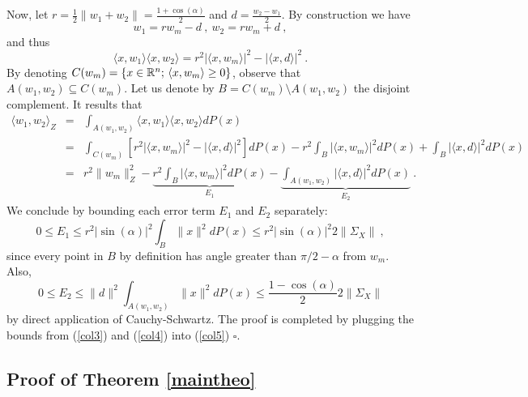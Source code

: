 Now, let $r = \frac{1}{2}\| w_1 + w_2 \| = \frac{1 + \cos(\alpha)}{2}$ and $d = \frac{w_2 - w_1}{2}$.
By construction we have 
$$w_1 = r w_m - d~,~ w_2 = r w_m + d~,$$
and thus 
\begin{equation}
\label{col2}
\langle x, w_1 \rangle  \langle x, w_2 \rangle = r^2 | \langle x, w_m \rangle |^2 - | \langle x, d \rangle |^2~.
\end{equation}
By denoting $C(w_m) = \{ x \in {\mathbb{R}}^n;\, \langle x, w_m \rangle \geq 0 \}$, 
observe that $A(w_1, w_2 ) \subseteq C(w_m)$. Let us denote by $B = C(w_m) \setminus A(w_1, w_2) $ the disjoint complement. It results that 
\begin{eqnarray}
\label{col5}
\langle w_1, w_2 \rangle_Z &=& \int_{A(w_1, w_2)} \langle x, w_1 \rangle  \langle x, w_2 \rangle dP(x) \nonumber \\
&=& \int_{C(w_m)} [r^2 | \langle x, w_m \rangle |^2 - | \langle x, d \rangle |^2 ] dP(x) - r^2 \int_B  | \langle x, w_m \rangle |^2 dP(x) + \int_B  | \langle x, d \rangle |^2  dP(x) \nonumber \\ 
&=& r^2 \| w_m \|_Z^2 - \underbrace{ r^2 \int_B  | \langle x, w_m \rangle |^2 dP(x)}_{E_1} - \underbrace{\int_{A(w_1, w_2)} | \langle x, d \rangle |^2  dP(x) }_{E_2}~. 
\end{eqnarray} 
We conclude by bounding each error term $E_1$ and $E_2$ separately:
\begin{equation}
\label{col3}
0 \leq E_1 \leq r^2 |\sin(\alpha)|^2 \int_B \| x \|^2 dP(x) \leq r^2 |\sin(\alpha)|^2 2 \| \Sigma_X\|~,
\end{equation}
since every point in $B$ by definition has angle greater than $\pi/2 - \alpha$ from $w_m$. Also,
\begin{equation}
\label{col4}
0 \leq E_2 \leq \|d \|^2 \int_{A(w_1, w_2)} \| x \|^2 dP(x) \leq \frac{1 - \cos(\alpha)}{2} 2 \| \Sigma_X \|
\end{equation}
by direct application of Cauchy-Schwartz. The proof is completed by plugging the bounds from (\ref{col3}) and (\ref{col4}) into (\ref{col5})  $\square$.


\subsection{Proof of Theorem \ref{maintheo}}

